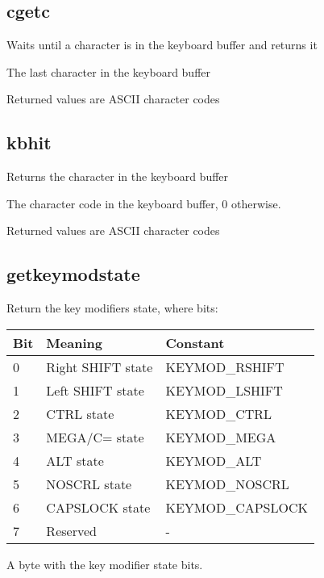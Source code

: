 \subsection{cgetc}
\begin{description}[leftmargin=2cm,style=nextline]
\item [Description:] { Waits until a character is in the keyboard buffer and returns it }
\item [Syntax:] 
\item [Desription:] {The last character in the keyboard buffer }
\item [Notes:] {Returned values are ASCII character codes}
\end{description}

\subsection{kbhit}
\begin{description}[leftmargin=2cm,style=nextline]
\item [Description:] { Returns the character in the keyboard buffer }
\item [Syntax:] 
\item [Desription:] {The character code in the keyboard buffer,  0 otherwise. }
\item [Notes:] {Returned values are ASCII character codes}
\end{description}

\subsection{getkeymodstate}
\begin{description}[leftmargin=2cm,style=nextline]
\item [Description:] {
   Return the key modifiers state, where bits:

\ttfamily
{\setlength{\tabcolsep}{1mm}
\begin{tabular}{|l|l|l|}
\hline
    Bit &         Meaning           & Constant \\
\hline
    0   &         Right SHIFT state & KEYMOD\_RSHIFT  \\
    1   &         Left  SHIFT state & KEYMOD\_LSHIFT  \\
    2   &         CTRL state        & KEYMOD\_CTRL  \\
    3   &         MEGA/C= state     & KEYMOD\_MEGA  \\
    4   &         ALT state         & KEYMOD\_ALT  \\
    5   &         NOSCRL state      & KEYMOD\_NOSCRL  \\
    6   &         CAPSLOCK state    & KEYMOD\_CAPSLOCK  \\
    7   &         Reserved          & -  \\
\hline
\end{tabular}
}}
\item [Syntax:] 
\item [Desription:] {A byte with the key modifier state bits.}
\end{description}

